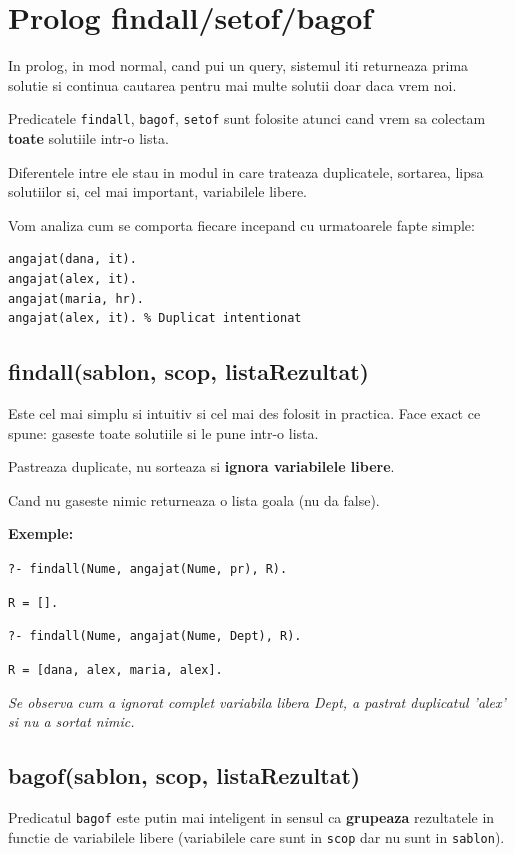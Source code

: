 \newpage

\section{Prolog findall/setof/bagof}

In prolog, in mod normal, cand pui un query, sistemul iti returneaza prima solutie
si continua cautarea pentru mai multe solutii doar daca vrem noi.

Predicatele \texttt{findall}, \texttt{bagof}, \texttt{setof} sunt folosite atunci cand
vrem sa colectam \textbf{toate} solutiile intr-o lista.

Diferentele intre ele stau in modul in care trateaza duplicatele, sortarea, lipsa solutiilor si,
cel mai important, variabilele libere.

Vom analiza cum se comporta fiecare incepand cu urmatoarele fapte simple:

\begin{lstlisting}
angajat(dana, it).
angajat(alex, it).
angajat(maria, hr).
angajat(alex, it). % Duplicat intentionat
\end{lstlisting}

\subsection*{findall(sablon, scop, listaRezultat)}
Este cel mai simplu si intuitiv si cel mai des folosit in practica. Face exact ce spune:
gaseste toate solutiile si le pune intr-o lista.

Pastreaza duplicate, nu sorteaza si \textbf{ignora variabilele libere}.

Cand nu gaseste nimic returneaza o lista goala (nu da false).

\textbf{Exemple:}

\texttt{?- findall(Nume, angajat(Nume, pr), R).}

\texttt{R = [].}

\vspace{\baselineskip}

\texttt{?- findall(Nume, angajat(Nume, Dept), R).}

\texttt{R = [dana, alex, maria, alex].}

\textit{Se observa cum a ignorat complet variabila libera Dept, a pastrat duplicatul 'alex' si nu a sortat nimic.}


\subsection*{bagof(sablon, scop, listaRezultat)}
Predicatul \texttt{bagof} este putin mai inteligent in sensul ca \textbf{grupeaza} rezultatele in functie de variabilele
libere (variabilele care sunt in \texttt{scop} dar nu sunt in \texttt{sablon}).

